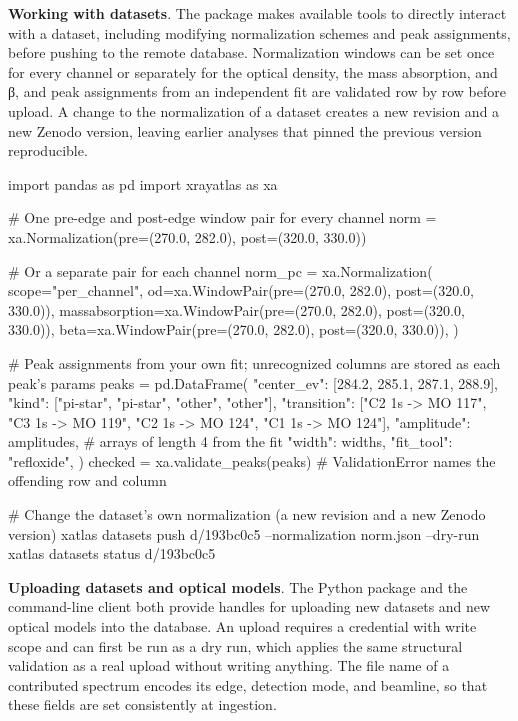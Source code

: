 \textbf{Working with datasets}. The package makes available tools to directly interact with a dataset, including modifying normalization schemes and peak assignments, before pushing to the remote database. Normalization windows can be set once for every channel or separately for the optical density, the mass absorption, and β, and peak assignments from an independent fit are validated row by row before upload. A change to the normalization of a dataset creates a new revision and a new Zenodo version, leaving earlier analyses that pinned the previous version reproducible.

\begin{codeblock}
import pandas as pd
import xrayatlas as xa

# One pre-edge and post-edge window pair for every channel
norm = xa.Normalization(pre=(270.0, 282.0), post=(320.0, 330.0))

# Or a separate pair for each channel
norm_pc = xa.Normalization(
    scope="per_channel",
    od=xa.WindowPair(pre=(270.0, 282.0), post=(320.0, 330.0)),
    massabsorption=xa.WindowPair(pre=(270.0, 282.0), post=(320.0, 330.0)),
    beta=xa.WindowPair(pre=(270.0, 282.0), post=(320.0, 330.0)),
)

# Peak assignments from your own fit; unrecognized columns are stored as each peak's params
peaks = pd.DataFrame({
    "center_ev":  [284.2, 285.1, 287.1, 288.9],
    "kind":       ["pi-star", "pi-star", "other", "other"],
    "transition": ["C2 1s -> MO 117", "C3 1s -> MO 119",
                   "C2 1s -> MO 124", "C1 1s -> MO 124"],
    "amplitude":  amplitudes,          # arrays of length 4 from the fit
    "width":      widths,
    "fit_tool":   "refloxide",
})
checked = xa.validate_peaks(peaks)  # ValidationError names the offending row and column
\end{codeblock}

\begin{codeblock}
# Change the dataset's own normalization (a new revision and a new Zenodo version)
xatlas datasets push d/193bc0c5 --normalization norm.json --dry-run
xatlas datasets status d/193bc0c5
\end{codeblock}

\textbf{Uploading datasets and optical models}. The Python package and the command-line client both provide handles for uploading new datasets and new optical models into the database. An upload requires a credential with write scope and can first be run as a dry run, which applies the same structural validation as a real upload without writing anything. The file name of a contributed spectrum encodes its edge, detection mode, and beamline, so that these fields are set consistently at ingestion.

